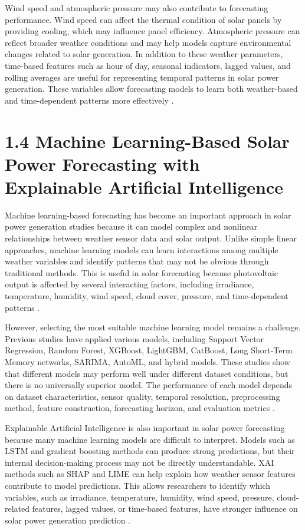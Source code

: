 Wind speed and atmospheric pressure may also contribute to forecasting performance. Wind speed can affect the thermal condition of solar panels by providing cooling, which may influence panel efficiency. Atmospheric pressure can reflect broader weather conditions and may help models capture environmental changes related to solar generation. In addition to these weather parameters, time-based features such as hour of day, seasonal indicators, lagged values, and rolling averages are useful for representing temporal patterns in solar power generation. These variables allow forecasting models to learn both weather-based and time-dependent patterns more effectively \parencite{JnanaVarshitha2025, TsaiLo2025, Duvuru2026}.

\section{1.4 Machine Learning-Based Solar Power Forecasting with Explainable Artificial Intelligence}

Machine learning-based forecasting has become an important approach in solar power generation studies because it can model complex and nonlinear relationships between weather sensor data and solar output. Unlike simple linear approaches, machine learning models can learn interactions among multiple weather variables and identify patterns that may not be obvious through traditional methods. This is useful in solar forecasting because photovoltaic output is affected by several interacting factors, including irradiance, temperature, humidity, wind speed, cloud cover, pressure, and time-dependent patterns \parencite{JnanaVarshitha2025, Bakht2025, Alhassan2025}.

However, selecting the most suitable machine learning model remains a challenge. Previous studies have applied various models, including Support Vector Regression, Random Forest, XGBoost, LightGBM, CatBoost, Long Short-Term Memory networks, SARIMA, AutoML, and hybrid models. These studies show that different models may perform well under different dataset conditions, but there is no universally superior model. The performance of each model depends on dataset characteristics, sensor quality, temporal resolution, preprocessing method, feature construction, forecasting horizon, and evaluation metrics \parencite{ArellanosTafur2025, TsaiLo2025, CarvalhoJunior2025}.

Explainable Artificial Intelligence is also important in solar power forecasting because many machine learning models are difficult to interpret. Models such as LSTM and gradient boosting methods can produce strong predictions, but their internal decision-making process may not be directly understandable. XAI methods such as SHAP and LIME can help explain how weather sensor features contribute to model predictions. This allows researchers to identify which variables, such as irradiance, temperature, humidity, wind speed, pressure, cloud-related features, lagged values, or time-based features, have stronger influence on solar power generation prediction \parencite{JnanaVarshitha2025, Eren2025, TsaiLo2025}.

